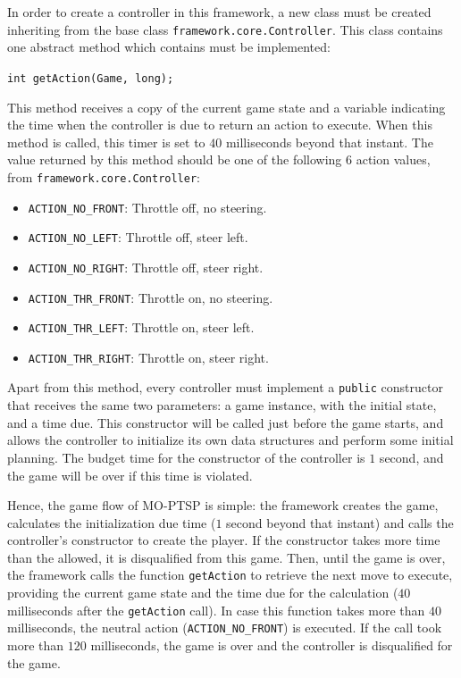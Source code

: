 \documentclass[conference]{IEEEtran}
\newcommand{\code}[1]{{\lstinline!#1!}}
\begin{document}
In order to create a controller in this framework, a new class must be created inheriting from the base class \code{framework.core.Controller}. This class contains one abstract method which contains must be implemented: 

\begin{center}
\code{int getAction(Game, long);}
\end{center}

This method receives a copy of the current game state and a variable indicating the time when the controller is due to return an action to execute. When this method is called, this timer is set to $40$ milliseconds beyond that instant. The value returned by this method should be one of the following $6$ action values, from \code{framework.core.Controller}:

\begin{itemize}
\item \code{ACTION_NO_FRONT}: Throttle off, no steering.
\item \code{ACTION_NO_LEFT}: Throttle off, steer left.
\item \code{ACTION_NO_RIGHT}: Throttle off, steer right.
\item \code{ACTION_THR_FRONT}: Throttle on, no steering. 
\item \code{ACTION_THR_LEFT}: Throttle on, steer left. 
\item \code{ACTION_THR_RIGHT}: Throttle on, steer right.
\end{itemize}

Apart from this method, every controller must implement a \code{public} constructor that receives the same two parameters: a game instance, with the initial state, and a time due. This constructor will be called just before the game starts, and allows the controller to initialize its own data structures and perform some initial planning. The budget time for the constructor of the controller is $1$ second, and the game will be over if this time is violated.

Hence, the game flow of MO-PTSP is simple: the framework creates the game, calculates the initialization due time ($1$ second beyond that instant) and calls the controller's constructor to create the player. If the constructor takes more time than the allowed, it is disqualified from this game. Then, until the game is over, the framework calls the function \code{getAction} to retrieve the next move to execute, providing the current game state and the time due for the calculation ($40$ milliseconds after the \code{getAction} call). In case this function takes more than $40$ milliseconds, the neutral action (\code{ACTION_NO_FRONT}) is executed. If the call took more than $120$ milliseconds, the game is over and the controller is disqualified for the game.
\end{document}
